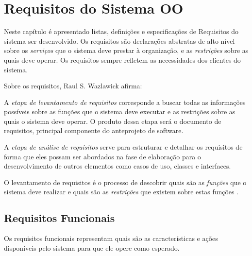 
\chapter{Requisitos do Sistema OO}


Neste capítulo é apresentado listas, definições e especificações de Requisitos do sistema ser desenvolvido. Os requisitos são declarações abstratas de alto nível sobre os \textit{serviços} que o sistema deve prestar à organização, e as \textit{restrições} sobre as quais deve operar. Os requisitos sempre refletem as necessidades dos clientes do sistema.

Sobre os requisitos,  Raul S. Wazlawick afirma:
\begin{citadireta}
    A \textit{etapa de levantamento de requisitos} corresponde a buscar todas as informações possíveis sobre as funções que o sistema deve executar e as restrições sobre as quais o sistema deve operar. O produto dessa etapa será o documento de requisitos, principal componente do anteprojeto de software.
    
    A \textit{etapa de análise de requisitos} serve para estruturar e detalhar os requisitos de forma que eles possam ser abordados na fase de elaboração para o desenvolvimento  de outros elementos como casos de uso, classes e interfaces.
    
    O levantamento de requisitos é o processo de descobrir quais são as \textit{funções} que o sistema deve realizar e quais são as \textit{restrições} que existem sobre estas funções  \cite{Wazlawick2011}.
\end{citadireta}



    \section{Requisitos Funcionais}
        Os requisitos funcionais representam quais são as características e ações disponíveis pelo sistema para que ele opere como esperado.
